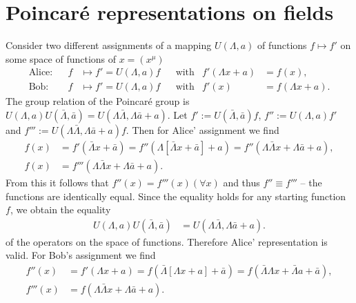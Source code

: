 \documentclass[english, parskip=full]{scrartcl}
\title{\titel}
\author{\autor}
\date{\today}
\newcommand{\kla}{}
\newcommand{\klam}{}
\newcommand{\tecxt}{}
\renewcommand{\tilde}{\bar}
\begin{document}
\maketitle  %

\section{Poincar\'e representations on fields}
Consider two different assignments of a mapping $U(\Lambda, a)$ of functions $f \mapsto f'$ on some space of functions of $x=(x^\mu)$
\begin{align}
\tecxt\text{Alice:} && f &\mapsto f' = U(\Lambda, a)f && \tecxt\text{with} & f'(\Lambda x + a) &= f(x),\\
\tecxt\text{Bob:} && f &\mapsto f' = U(\Lambda, a)f && \tecxt\text{with} & f'(x) &= f(\Lambda x + a).
\end{align}
The group relation of the Poincar\'e group is $U(\Lambda, a) U(\tilde{\Lambda}, \tilde{a}) = U(\Lambda\tilde{\Lambda}, \Lambda \tilde{a} + a)$.
Let $f' := U(\tilde{\Lambda}, \tilde{a})f$, $f'' := U(\Lambda, a)f'$ and $f''' := U(\Lambda\tilde{\Lambda}, \Lambda \tilde{a} + a)f$.
Then for Alice' assignment we find
\begin{align}
f(x) &= f'(\tilde{\Lambda}x + \tilde{a}) = f''\kla\left( \Lambda \klam\left[ \tilde{\Lambda}x + \tilde{a} \right] + a \right) = f''(\Lambda\tilde{\Lambda} x + \Lambda \tilde{a} + a),\\
f(x) &= f'''(\Lambda\tilde{\Lambda} x + \Lambda \tilde{a} + a).
\end{align}
From this it follows that $f''(x) = f'''(x) (\forall x)$ and thus $f'' \equiv f'''$ -- the functions are identically equal.
Since the equality holds for any starting function $f$, we obtain the equality 
\begin{align}
U(\Lambda, a) U(\tilde{\Lambda}, \tilde{a}) &= U(\Lambda\tilde{\Lambda}, \Lambda \tilde{a} + a).
\end{align} 
of the operators on the space of functions.
Therefore Alice' representation is valid.
For Bob's assignment we find
\begin{align}
f''(x) &= f'(\Lambda x + a) = f\kla\left( \tilde{\Lambda} \klam\left[ \Lambda x + a \right] + \tilde{a} \right) = f(\tilde{\Lambda}\Lambda x + \tilde{\Lambda} a + \tilde{a}),\\
f'''(x) &= f(\Lambda\tilde{\Lambda} x + \Lambda \tilde{a} + a).
\end{align}
\end{document}
